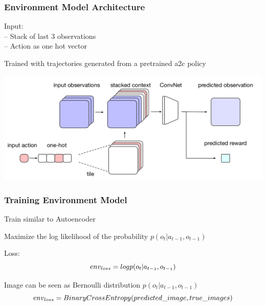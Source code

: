 \begin{frame}
    \frametitle{Environment Model Architecture}

\begin{multicols}{2}
	\begin{PraesentationAufzaehlung}
		\item Input:\\
		-- Stack of last 3 observations\\
		-- Action as one hot vector\\
		\item Trained with trajectories generated from a pretrained a2c policy
	\end{PraesentationAufzaehlung}
    \vfill\columnbreak
	\begin{center}
    \includegraphics[width=\columnwidth]{./Images/environment_model_architecture.png}%
	\end{center}
\end{multicols}
    
\end{frame}
\clearpage




\begin{frame}
    \frametitle{Training Environment Model}

\begin{PraesentationAufzaehlung}
	\item Train similar to Autoencoder
	\item Maximize the log likelihood of the probability $p(o_t | a_{t-1}, o_{t-1})$
	\item Loss:\\
	\begin{equation}
	\mathnormal{
	env_{loss} = log p(o_t | a_{t-1}, o_{t-1})}
	\end{equation}	
	\item Image can be seen as Bernoulli distribution $p(o_t | a_{t-1}, o_{t-1})$
	\begin{equation}
	\mathnormal{
	env_{loss} = Binary Cross Entropy(predicted\_image, true\_images)
	}
	\end{equation}
\end{PraesentationAufzaehlung}
    
\end{frame}
\clearpage


